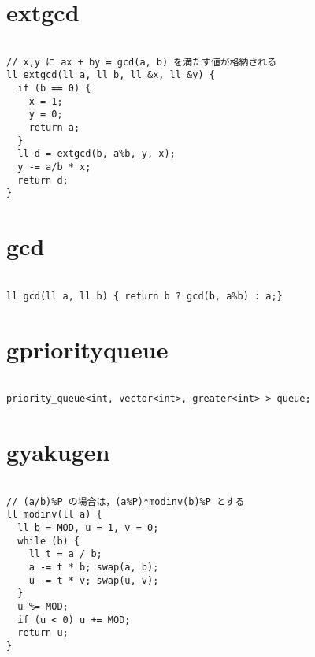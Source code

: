 \documentclass[a4j,titlepage]{jarticle} %
\begin{document}
\color{white}
\section{extgcd}
\color{black}
\begin{lstlisting}[caption=extgcd]

// x,y に ax + by = gcd(a, b) を満たす値が格納される
ll extgcd(ll a, ll b, ll &x, ll &y) {
  if (b == 0) {
    x = 1;
    y = 0;
    return a;
  }
  ll d = extgcd(b, a%b, y, x);
  y -= a/b * x;
  return d;
}

\end{lstlisting}

\color{white}
\section{gcd}
\color{black}
\begin{lstlisting}[caption=gcd]

ll gcd(ll a, ll b) { return b ? gcd(b, a%b) : a;}

\end{lstlisting}

\color{white}
\section{gpriorityqueue}
\color{black}
\begin{lstlisting}[caption=gpriorityqueue]

priority_queue<int, vector<int>, greater<int> > queue;

\end{lstlisting}

\color{white}
\section{gyakugen}
\color{black}
\begin{lstlisting}[caption=gyakugen]

// (a/b)%P の場合は，(a%P)*modinv(b)%P とする
ll modinv(ll a) {
  ll b = MOD, u = 1, v = 0;
  while (b) {
    ll t = a / b;
    a -= t * b; swap(a, b);
    u -= t * v; swap(u, v);
  }
  u %= MOD;
  if (u < 0) u += MOD;
  return u;
}

\end{lstlisting}

\color{white}
\end{document}
